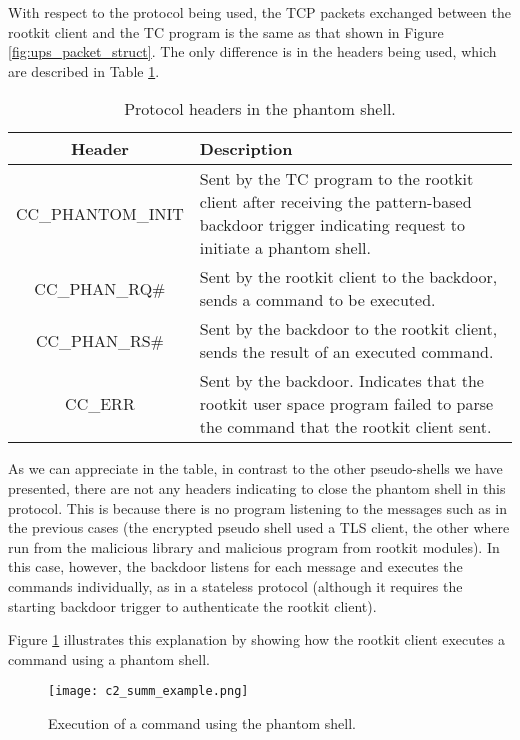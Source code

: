 With respect to the protocol being used, the TCP packets exchanged between the rootkit client and the TC program is the same as that shown in Figure \ref{fig:ups_packet_struct}. The only difference is in the headers being used, which are described in Table \ref{table:phantom_headers}.

\begin{table}[htbp]
\begin{tabular}{|c|>{\centering\arraybackslash}p{8cm}|}
\hline
\textbf{Header} & \textbf{Description}\\
\hline
\hline
CC\_PHANTOM\_INIT & Sent by the TC program to the rootkit client after receiving the pattern-based backdoor trigger indicating request to initiate a phantom shell.\\
\hline
CC\_PHAN\_RQ\# & Sent by the rootkit client to the backdoor, sends a command to be executed.\\
\hline
CC\_PHAN\_RS\# & Sent by the backdoor to the rootkit client, sends the result of an executed command.\\
\hline
CC\_ERR & Sent by the backdoor. Indicates that the rootkit user space program failed to parse the command that the rootkit client sent.\\
\hline
\end{tabular}
\caption{Protocol headers in the phantom shell.}
\label{table:phantom_headers}
\end{table}

As we can appreciate in the table, in contrast to the other pseudo-shells we have presented, there are not any headers indicating to close the phantom shell in this protocol. This is because there is no program listening to the messages such as in the previous cases (the encrypted pseudo shell used a TLS client, the other where run from the malicious library and malicious program from rootkit modules). In this case, however, the backdoor listens for each message and executes the commands individually, as in a stateless protocol (although it requires the starting backdoor trigger to authenticate the rootkit client).

Figure \ref{fig:c2_summ_example} illustrates this explanation by showing how the rootkit client executes a command using a phantom shell.

\begin{figure}[htbp]
	\centering
	\texttt{[image: c2\_summ\_example.png]}
	\caption{Execution of a command using the phantom shell.}
	\label{fig:c2_summ_example}
\end{figure}

